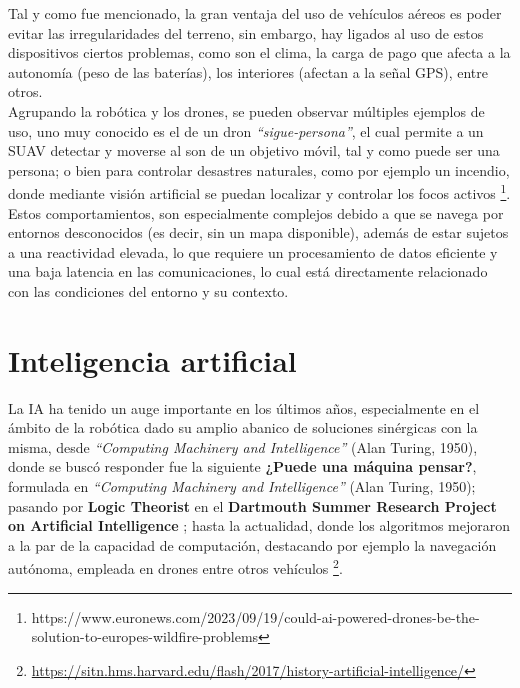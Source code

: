 Tal y como fue mencionado, la gran ventaja del uso de vehículos aéreos es poder evitar las irregularidades del terreno, sin embargo, hay ligados al uso de estos dispositivos ciertos problemas, como son el clima, la carga de pago que afecta a la autonomía (peso de las baterías), los interiores (afectan a la señal GPS), entre otros.\\

Agrupando la robótica y los drones, se pueden observar múltiples ejemplos de uso, uno muy conocido es el de un dron \emph{``sigue-persona''}, el cual permite a un \ac{SUAV} detectar y moverse al son de un objetivo móvil, tal y como puede ser una persona; o bien para controlar desastres naturales, como por ejemplo un incendio, donde mediante visión artificial se puedan localizar y controlar los focos activos \footnote[13]{https://www.euronews.com/2023/09/19/could-ai-powered-drones-be-the-solution-to-europes-wildfire-problems}.\\

Estos comportamientos, son especialmente complejos debido a que se navega por entornos desconocidos (es decir, sin un mapa disponible), además de estar sujetos a una reactividad elevada, lo que requiere un procesamiento de datos eficiente y una baja latencia en las comunicaciones, lo cual está directamente relacionado con las condiciones del entorno y su contexto.

\section{Inteligencia artificial}
\label{subsec:inteligencia_artificial}

La \ac{IA} ha tenido un auge importante en los últimos años, especialmente en el ámbito de la robótica dado su amplio abanico de soluciones sinérgicas con la misma, desde \emph{``Computing Machinery and Intelligence''} (Alan Turing, 1950), donde se buscó responder fue la siguiente \textbf{¿Puede una máquina pensar?}, formulada en \emph{``Computing Machinery and Intelligence''} (Alan Turing, 1950); pasando por \textbf{Logic Theorist} en el \textbf{Dartmouth Summer Research Project on Artificial Intelligence} \cite{logic-theorist}; hasta la actualidad, donde los algoritmos mejoraron a la par de la capacidad de computación, destacando por ejemplo la navegación autónoma, empleada en drones entre otros vehículos \footnote[14]{\url{https://sitn.hms.harvard.edu/flash/2017/history-artificial-intelligence/}}.\\

